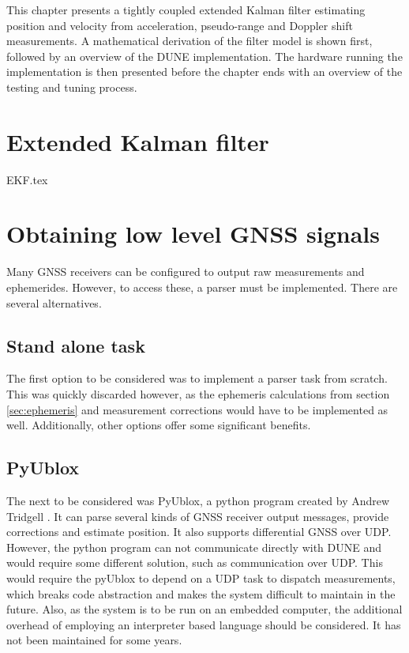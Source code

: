 \graphicspath{{Implementation/}}
\label{ch:implementation}

This chapter presents a tightly coupled extended Kalman filter estimating position and velocity from acceleration, pseudo-range and Doppler shift measurements. A mathematical derivation of the filter model is shown first, followed by an overview of the DUNE implementation. The hardware running the implementation is then presented before the chapter ends with an overview of the testing and tuning process. 

\section{Extended Kalman filter}
\label{sec:imp:ekf}
    {EKF.tex}

\section{Obtaining low level GNSS signals}
    Many GNSS receivers can be configured to output raw measurements and ephemerides. However, to access these, a parser must be implemented. There are several alternatives.\\ 
    
    \subsection{Stand alone task}
    The first option to be considered was to implement a parser task from scratch. This was quickly discarded however, as the ephemeris calculations from section \ref{sec:ephemeris} and measurement corrections would have to be implemented as well. Additionally, other options offer some significant benefits.\\
    
    \subsection{PyUblox}
    The next to be considered was PyUblox, a python program created by Andrew Tridgell \cite{pyublox}. It can parse several kinds of GNSS receiver output messages, provide corrections and estimate position. It also supports differential GNSS over UDP. However, the python program can not communicate directly with DUNE and would require some different solution, such as communication over UDP. This would require the pyUblox to depend on a UDP task to dispatch measurements, which breaks code abstraction and makes the system difficult to maintain in the future. Also, as the system is to be run on an embedded computer, the additional overhead of employing an interpreter based language should be considered. It has not been maintained for some years.\\
    
